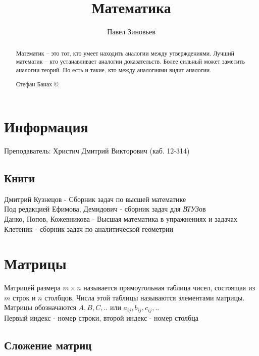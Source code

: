 \documentclass[a4paper, 11pt, oneside]{article}
\title{Математика}
\author{Павел Зиновьев}
\begin{document}
\maketitle
\begin{abstract}
	Математик – это тот, кто умеет находить аналогии между утверждениями. Лучший 
	математик – кто устанавливает аналогии доказательств. Более сильный может заметить 
	аналогии теорий. Но есть и такие, кто между аналогиями видит аналогии.
	\begin{flushright}
		 Стефан Банах \copyright
	\end{flushright}
\end{abstract}
\newpage
\tableofcontents
\contentsname
\newpage


\section{Информация}
Преподаватель: Христич Дмитрий Викторович (каб. 12-314)
\subsection{Книги}

Дмитрий Кузнецов - Сборник задач по высшей математике\\
Под редакцией Ефимова, Демидович - сборник задач для {\itshape ВТУЗ}ов\\
Данко, Попов, Кожевникова - Высшая математика в упражнениях и задачах\\
Клетеник - сборник задач по аналитической геометрии

\section{Матрицы}
Матрицей размера $m\times n$ называется прямоугольная таблица чисел, состоящая из $m$ строк и $n$ столбцов. Числа этой таблицы называются элементами матрицы. Матрицы обозначаются $A, B, C,..$ или $a_{ij}, b_{ij}, c_{ij},..$\\
Первый индекс - номер строки, второй индекс - номер столбца

\subsection{Сложение матриц}
\end{document}
